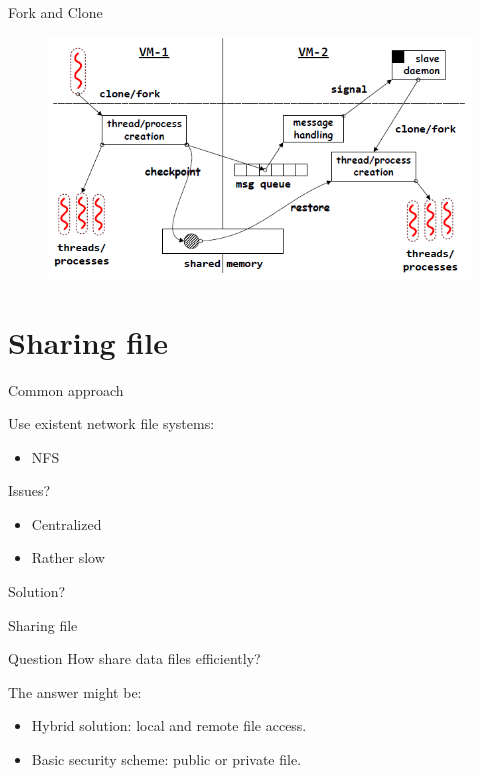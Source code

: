 \documentclass{beamer}
\begin{document}
	\begin{frame}{Fork and Clone}
	
		\begin{figure} [H]
			\centering
			\includegraphics[scale=0.40]{img/cerberus-fork-clone}
		\end{figure}	
	
	\end{frame}

\section{Sharing file}
	
	\begin{frame}{Common approach}	
	
		Use existent network file systems:
		\begin{itemize}
		\item NFS
		\end{itemize}
		
		Issues?
		\begin{itemize}
		\item Centralized
		\item Rather slow
		\end{itemize}		

		\begin{alertblock}{}
			Solution?
		\end{alertblock}

	\end{frame}	
	
	\begin{frame}{Sharing file}	
	
		\begin{block}{Question}
			How share data files efficiently?
		\end{block}
		
		The answer might be:		
		\begin{itemize}
		\item Hybrid solution: local and remote file access.
		\item Basic security scheme: public or private file.
		\end{itemize}

	\end{frame}
\end{document}
